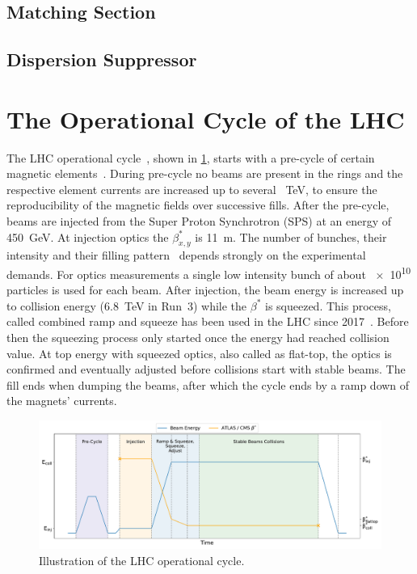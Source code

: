\subsection{Matching Section}

\subsection{Dispersion Suppressor}


\section{The Operational Cycle of the LHC}

The LHC operational cycle~\cite{Report:LHCModes}, shown in \cref{fig:lhc_cycle}, starts with a pre-cycle of certain magnetic elements~\cite{Report:LHCMagnetsPreCycles}.
During pre-cycle no beams are present in the rings and the respective element currents are increased up to several \qty{}{\tera\electronvolt}, to ensure the reproducibility of the magnetic fields over successive fills.
After the pre-cycle, beams are injected from the Super Proton Synchrotron (SPS) at an energy of \qty{450}{\giga\electronvolt}.
At injection optics the \(\beta^{\ast}_{x,y}\) is \qty{11}{\metre}.
The number of bunches, their intensity and their filling pattern~\cite{Report:LHCStandardFillingSchemes} depends strongly on the experimental demands.
For optics measurements a single low intensity bunch of about \num{e10} particles is used for each beam.
After injection, the beam energy is increased up to collision energy (\qty{6.8}{\tera\electronvolt} in Run~3) while the \(\beta^{\ast}\) is squeezed.
This process, called combined ramp and squeeze has been used in the LHC since 2017~\cite{IPAC:Camillocci:CombinedRampAndSqueeze}.
Before then the squeezing process only started once the energy had reached collision value.
At top energy with squeezed optics, also called as flat-top, the optics is confirmed and eventually adjusted before collisions start with stable beams.
The fill ends when dumping the beams, after which the cycle ends by a ramp down of the magnets' currents.

\begin{figure}[h]
    \centering
    \includegraphics*[width=0.99\columnwidth]{Figures/Chapter3/lhc_cycle.pdf}
    \caption{Illustration of the LHC operational cycle.}
    \label{fig:lhc_cycle}
  \end{figure}

